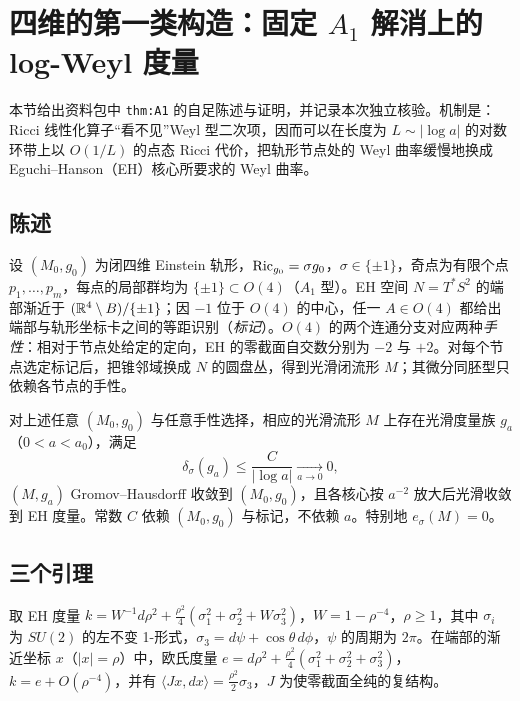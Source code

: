 \section{四维的第一类构造：固定 $A_1$ 解消上的 log-Weyl 度量}\label{sec:logweyl}

本节给出资料包中 \texttt{thm:A1} 的自足陈述与证明，并记录本次独立核验。机制是：Ricci 线性化算子“看不见”Weyl 型二次项，因而可以在长度为 $L\sim|\log a|$ 的对数环带上以 $O(1/L)$ 的点态 Ricci 代价，把轨形节点处的 Weyl 曲率缓慢地换成 Eguchi--Hanson（EH）核心所要求的 Weyl 曲率。

\subsection{陈述}
设 $(M_0,g_0)$ 为闭四维 Einstein 轨形，$\operatorname{Ric}_{g_0}=\sigma g_0$，$\sigma\in\{\pm1\}$，奇点为有限个点 $p_1,\dots,p_m$，每点的局部群均为 $\{\pm1\}\subset O(4)$（$A_1$ 型）。EH 空间 $N=T^*S^2$ 的端部渐近于 $(\mathbb R^4\setminus B)/\{\pm1\}$；因 $-1$ 位于 $O(4)$ 的中心，任一 $A\in O(4)$ 都给出端部与轨形坐标卡之间的等距识别（\emph{标记}）。$O(4)$ 的两个连通分支对应两种\emph{手性}：相对于节点处给定的定向，EH 的零截面自交数分别为 $-2$ 与 $+2$。对每个节点选定标记后，把锥邻域换成 $N$ 的圆盘丛，得到光滑闭流形 $M$；其微分同胚型只依赖各节点的手性。

\begin{theorem}\label{thm:A1}
对上述任意 $(M_0,g_0)$ 与任意手性选择，相应的光滑流形 $M$ 上存在光滑度量族 $g_a$（$0<a<a_0$），满足
\begin{equation}\label{eq:A1bound}
\delta_\sigma(g_a)\le\frac{C}{|\log a|}\xrightarrow[a\to0]{}0,
\end{equation}
$(M,g_a)$ Gromov--Hausdorff 收敛到 $(M_0,g_0)$，且各核心按 $a^{-2}$ 放大后光滑收敛到 EH 度量。常数 $C$ 依赖 $(M_0,g_0)$ 与标记，不依赖 $a$。特别地 $e_\sigma(M)=0$。
\end{theorem}

\subsection{三个引理}
取 EH 度量 $k=W^{-1}d\rho^2+\frac{\rho^2}{4}(\sigma_1^2+\sigma_2^2+W\sigma_3^2)$，$W=1-\rho^{-4}$，$\rho\ge1$，其中 $\sigma_i$ 为 $SU(2)$ 的左不变 1-形式，$\sigma_3=d\psi+\cos\theta\,d\phi$，$\psi$ 的周期为 $2\pi$。在端部的渐近坐标 $x$（$|x|=\rho$）中，欧氏度量 $e=d\rho^2+\frac{\rho^2}{4}(\sigma_1^2+\sigma_2^2+\sigma_3^2)$，$k=e+O(\rho^{-4})$，并有 $\langle Jx,dx\rangle=\frac{\rho^2}{2}\sigma_3$，$J$ 为使零截面全纯的复结构。

